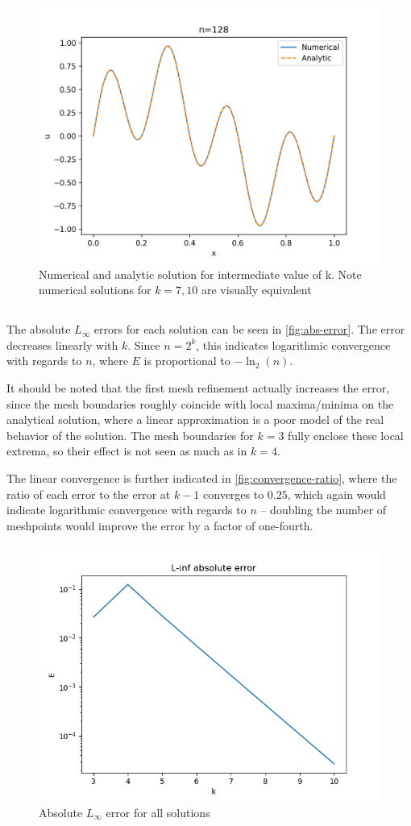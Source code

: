 \documentclass{template}
\begin{document}
\begin{figure}
    \centering
    \includegraphics[width=0.48\linewidth]{midk.png}
    \caption{Numerical and analytic solution for intermediate value of k. Note numerical solutions for $k=7, 10$ are visually equivalent}
    \label{fig:mid-soln}
\end{figure}


\subsection{}

The absolute $L_{\infty}$ errors for each solution can be seen in \autoref{fig:abs-error}. The error decreases linearly with $k$. Since $n=2^k$, this indicates logarithmic convergence with regards to $n$, where $E$ is proportional to $-\ln_2(n)$.

It should be noted that the first mesh refinement actually increases the error, since the mesh boundaries roughly coincide with local maxima/minima on the analytical solution, where a linear approximation is a poor model of the real behavior of the solution. The mesh boundaries for $k=3$ fully enclose these local extrema, so their effect is not seen as much as in $k=4$.

The linear convergence is further indicated in \autoref{fig:convergence-ratio}, where the ratio of each error to the error at $k-1$ converges to $0.25$, which again would indicate logarithmic convergence with regards to $n$ -- doubling the number of meshpoints would improve the error by a factor of one-fourth. 


\begin{figure}
    \centering
    \includegraphics[width=0.65\linewidth]{abs_err.png}
    \caption{Absolute $L_{\infty}$ error for all solutions}
    \label{fig:abs-error}
\end{figure}
\end{document}
